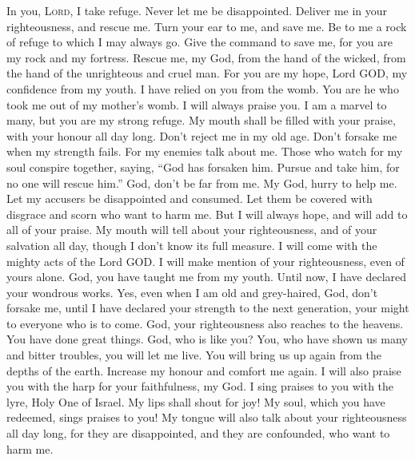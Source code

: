  In you, \textsc{Lord}, I take refuge. Never let me be
disappointed.  Deliver me in your righteousness, and
rescue me. Turn your ear to me, and save me.  Be to me a
rock of refuge to which I may always go. Give the command to save me,
for you are my rock and my fortress.  Rescue me, my God,
from the hand of the wicked, from the hand of the unrighteous and cruel
man.  For you are my hope, Lord GOD, my confidence from my
youth.  I have relied on you from the womb. You are he who
took me out of my mother's womb. I will always praise you.
 I am a marvel to many, but you are my strong refuge.
 My mouth shall be filled with your praise, with your
honour all day long.  Don't reject me in my old age. Don't
forsake me when my strength fails.  For my enemies talk
about me. Those who watch for my soul conspire together, 
saying, ``God has forsaken him. Pursue and take him, for no one will
rescue him.''  God, don't be far from me. My God, hurry
to help me.  Let my accusers be disappointed and
consumed. Let them be covered with disgrace and scorn who want to harm
me.  But I will always hope, and will add to all of your
praise.  My mouth will tell about your righteousness, and
of your salvation all day, though I don't know its full measure.
 I will come with the mighty acts of the Lord GOD. I will
make mention of your righteousness, even of yours alone. 
God, you have taught me from my youth. Until now, I have declared your
wondrous works.  Yes, even when I am old and grey-haired,
God, don't forsake me, until I have declared your strength to the next
generation, your might to everyone who is to come.  God,
your righteousness also reaches to the heavens. You have done great
things. God, who is like you?  You, who have shown us
many and bitter troubles, you will let me live. You will bring us up
again from the depths of the earth.  Increase my honour
and comfort me again.  I will also praise you with the
harp for your faithfulness, my God. I sing praises to you with the lyre,
Holy One of Israel.  My lips shall shout for joy! My
soul, which you have redeemed, sings praises to you!  My
tongue will also talk about your righteousness all day long, for they
are disappointed, and they are confounded, who want to harm me.

